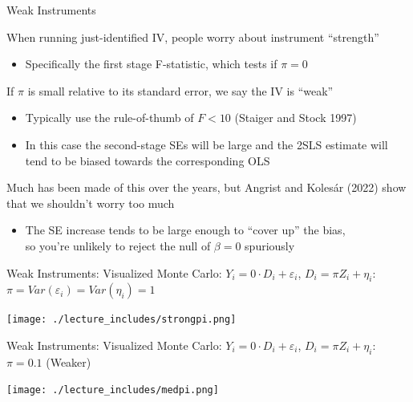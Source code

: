 \documentclass{beamer}
\begin{document}
\begin{frame}{Weak Instruments}
\vspace{-0.2cm}

When running just-identified IV, people worry about instrument ``strength'' \vspace{-0.7cm}
\begin{itemize}
  \item Specifically the first stage F-statistic, which tests if $\pi=0$ 
\end{itemize}
\smallskip\pause

If $\pi$ is small relative to its standard error, we say the IV is ``weak''
\begin{itemize}
  \item Typically use the rule-of-thumb of $F<10$ (Staiger and Stock 1997)
  \item In this case the second-stage SEs will be large and the 2SLS estimate will tend to be biased towards the corresponding OLS
\end{itemize}\pause

Much has been made of this over the years, but Angrist and Koles\'{a}r (2022) show that we shouldn't worry too much
\begin{itemize}
  \item The SE increase tends to be large enough to ``cover up'' the bias, \\ so you're unlikely to reject the null of $\beta=0$ spuriously 
\end{itemize}

\end{frame}

\begin{frame}{Weak Instruments: Visualized}
\vspace{-0.2cm}
Monte Carlo: $Y_i=0\cdot D_i + \varepsilon_i$, $D_i=\pi Z_i+\eta_i$: $\pi=Var(\varepsilon_i)=Var(\eta_i)=1$
\begin{center}
\texttt{[image: ./lecture\_includes/strongpi.png]}
\end{center}

\end{frame}

\begin{frame}{Weak Instruments: Visualized}
\vspace{-0.2cm}
Monte Carlo: $Y_i=0\cdot D_i + \varepsilon_i$, $D_i=\pi Z_i+\eta_i$: $\pi=0.1$ (Weaker)
\begin{center}
\texttt{[image: ./lecture\_includes/medpi.png]}
\end{center}

\end{frame}
\end{document}
